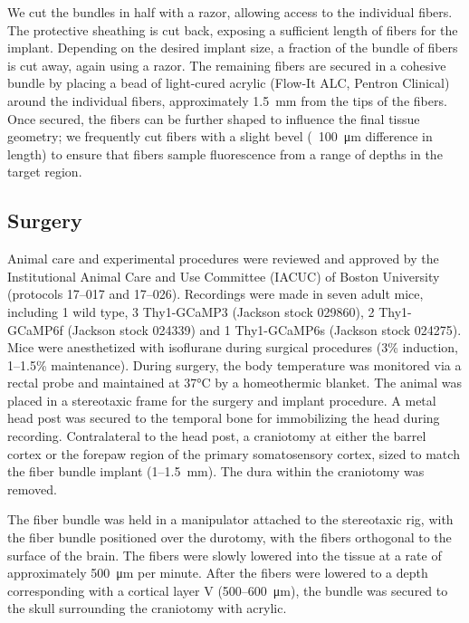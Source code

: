 We cut the bundles in half with a razor, allowing access to the 
individual fibers. The protective sheathing is cut back, exposing a 
sufficient length of fibers for the implant. Depending on the desired 
implant size, a fraction of the bundle of fibers is cut away, again 
using a razor. The remaining fibers are secured in a cohesive bundle 
by placing a bead of light-cured acrylic (Flow-It ALC, Pentron 
Clinical) around the individual fibers, approximately 
1.5~\si{\milli\meter} from the tips of the fibers. Once secured, the 
fibers can be further shaped to influence the final tissue geometry; 
we frequently cut fibers with a slight bevel (~100~\si{\micro\meter} 
difference in length) to ensure that fibers sample fluorescence from a
 range of depths in the target region.

\subsection{Surgery}

Animal care and experimental procedures were reviewed and approved by 
the Institutional Animal Care and Use Committee (IACUC) of Boston 
University (protocols 17--017 and 17--026). Recordings were made in 
seven adult mice, including 1 wild type, 3 Thy1-GCaMP3 (Jackson stock 
029860), 2 Thy1-GCaMP6f (Jackson stock 024339) and 1 Thy1-GCaMP6s 
(Jackson stock 024275). Mice were anesthetized with isoflurane during 
surgical procedures (3\% induction, 1--1.5\% maintenance). During 
surgery, the body temperature was monitored via a rectal probe and 
maintained at 37\si{\celsius} by a homeothermic blanket. The animal 
was placed in a stereotaxic frame for the surgery and implant 
procedure. A metal head post was secured to the temporal bone for 
immobilizing the head during recording. Contralateral to the head 
post, a craniotomy at either the barrel cortex or the forepaw region 
of the primary somatosensory cortex, sized to match the fiber bundle 
implant (1--1.5~\si{\milli\meter}). The dura within the craniotomy was
 removed.



The fiber bundle was held in a manipulator attached to the stereotaxic
 rig, with the fiber bundle positioned over the durotomy, with the 
fibers orthogonal to the surface of the brain. The fibers were slowly 
lowered into the tissue at a rate of approximately 
500~\si{\micro\meter} per minute. After the fibers were lowered to a 
depth corresponding with a cortical layer V (500--600~\si{\micro\meter}), 
the bundle was secured to the skull surrounding the craniotomy with 
acrylic.

